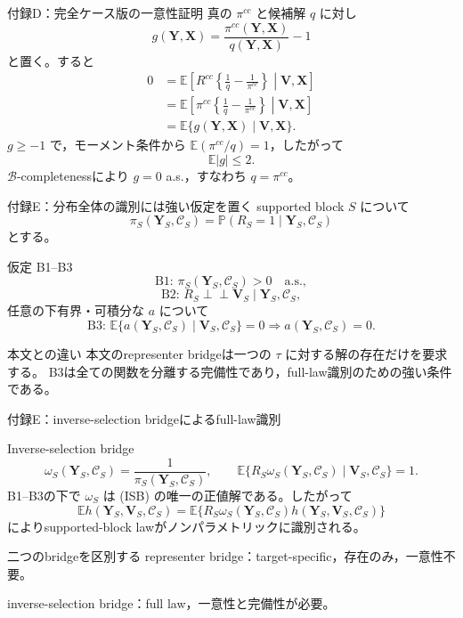 \documentclass[aspectratio=169,10pt]{beamer}
\newcommand{\E}{\mathbb{E}}
\newcommand{\Prb}{\mathbb{P}}
\newcommand{\1}{\mathbf{1}}
\newcommand{\indep}{\mathrel{\perp\!\!\!\perp}}
\newcommand{\Y}{\bm{Y}}
\newcommand{\V}{\bm{V}}
\newcommand{\X}{\bm{X}}
\begin{document}
\begin{frame}[shrink=6]{付録D：完全ケース版の一意性証明}
真の $\pi^{cc}$ と候補解 $q$ に対し
\[
g(\Y,\X)=\frac{\pi^{cc}(\Y,\X)}{q(\Y,\X)}-1
\]
と置く。すると
\[
\begin{aligned}
0
&=\E\left[R^{cc}\left\{\frac1q-\frac1{\pi^{cc}}\right\}
\middle|\V,\X\right]\\
&=\E\left[\pi^{cc}\left\{\frac1q-\frac1{\pi^{cc}}\right\}
\middle|\V,\X\right]\\
&=\E\{g(\Y,\X)\mid\V,\X\}.
\end{aligned}
\]
$g\ge-1$ で，モーメント条件から $\E(\pi^{cc}/q)=1$，したがって
\[
\E|g|\le2.
\]
$\mathcal B$-completenessにより $g=0$ a.s.，すなわち $q=\pi^{cc}$。
\end{frame}

\begin{frame}{付録E：分布全体の識別には強い仮定を置く}
supported block $S$ について
\[
\pi_S(\Y_S,\mathcal C_S)
=\Prb(R_S=1\mid\Y_S,\mathcal C_S)
\]
とする。
\begin{block}{仮定 B1--B3}
\scriptsize
\[
\text{B1: }\pi_S(\Y_S,\mathcal C_S)>0\quad\text{a.s.},
\]
\[
\text{B2: }R_S\indep\V_S\mid\Y_S,\mathcal C_S,
\]
任意の下有界・可積分な $a$ について
\[
\text{B3: }\E\{a(\Y_S,\mathcal C_S)\mid\V_S,\mathcal C_S\}=0
\Rightarrow a(\Y_S,\mathcal C_S)=0.
\]
\end{block}
\begin{alertblock}{本文との違い}
本文のrepresenter bridgeは一つの $\tau$ に対する解の存在だけを要求する。
B3は全ての関数を分離する完備性であり，full-law識別のための強い条件である。
\end{alertblock}
\end{frame}

\begin{frame}[shrink=6]{付録E：inverse-selection bridgeによるfull-law識別}
\begin{alertblock}{Inverse-selection bridge}
\scriptsize
\[
\omega_S(\Y_S,\mathcal C_S)=\frac1{\pi_S(\Y_S,\mathcal C_S)},
\qquad
\E\{R_S\omega_S(\Y_S,\mathcal C_S)\mid\V_S,\mathcal C_S\}=1.
\tag{ISB}
\]
B1--B3の下で $\omega_S$ は (ISB) の唯一の正値解である。したがって
\[
\E h(\Y_S,\V_S,\mathcal C_S)
=\E\{R_S\omega_S(\Y_S,\mathcal C_S)
h(\Y_S,\V_S,\mathcal C_S)\}
\tag{BR}
\]
によりsupported-block lawがノンパラメトリックに識別される。
\end{alertblock}
\begin{block}{二つのbridgeを区別する}
\scriptsize
representer bridge：target-specific，存在のみ，一意性不要。\par
inverse-selection bridge：full law，一意性と完備性が必要。
\end{block}
\end{frame}
\end{document}

